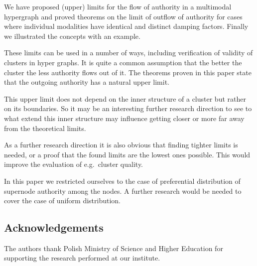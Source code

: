 \documentclass{fundam}
\begin{document}
We have   proposed (upper) limits for
the flow of  authority in a multimodal hypergraph
and  proved theorems on the limit of outflow of authority for cases where individual modalities have identical and distinct damping factors.
Finally we  illustrated the concepts with an example.

These limits can be used
in a number of ways, including verification of validity of   clusters in hyper graphs. It is  quite a common assumption that the better the cluster the less authority flows out of it.
The theorems proven in this paper state that the outgoing authority has a natural upper limit.

This upper limit does not depend on the inner structure of a cluster but rather on its boundaries.
So it may be an interesting further research direction to see to what extend this inner structure may influence getting closer or more far away from the theoretical limits.


As a further research direction it is also obvious that finding tighter limits is needed, or a proof that the found limits are the lowest ones possible. This would improve the evaluation of e.g.\  cluster quality.

In this paper we restricted ourselves to the case of preferential distribution of supernode authority among the nodes. A further research would be needed to cover the case of uniform distribution.


\subsection*{Acknowledgements}
The authors thank Polish Ministry of Science and Higher Education for supporting the research performed at our institute.









%



\end{document}
